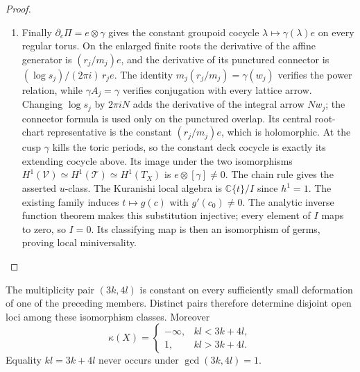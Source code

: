 \begin{proof}
\begin{enumerate}[label=\arabic*.,leftmargin=*]
\item Finally $\partial_c\Pi=e\otimes\gamma$ gives the constant
groupoid cocycle $\lambda\mapsto\gamma(\lambda)e$ on every
regular torus.  On the enlarged finite roots the derivative of the
affine generator is $(r_j/m_j)e$, and the derivative of its
punctured connector is $(\log s_j)/(2\pi i)\,r_je$.
The identity $m_j(r_j/m_j)=\gamma(w_j)$ verifies the power
relation, while $\gamma A_j=\gamma$ verifies conjugation with
every lattice arrow.  Changing $\log s_j$ by $2\pi i N$
adds the derivative of the integral arrow $Nw_j$; the connector
formula is used only on the punctured overlap.  Its central
root-chart representative is the constant $(r_j/m_j)e$,
which is holomorphic.  At the cusp $\gamma$ kills the toric periods,
so the constant deck cocycle is exactly its extending cocycle
above.  Its image under the two isomorphisms
$H^1(\mathcal V)\simeq H^1(\mathcal T)\simeq H^1(T_X)$
is $e\otimes[\gamma]\ne0$.  The chain rule gives the asserted
$u$-class.  The Kuranishi local algebra is
$\mathbb C\{t\}/I$ since $h^1=1$.  The existing family induces
$t\mapsto g(c)$ with $g'(c_0)\ne0$.  The analytic inverse
function theorem makes this substitution injective; every
element of $I$ maps to zero, so $I=0$.  Its classifying map is
then an isomorphism of germs, proving local miniversality.
\end{enumerate}
\end{proof}

\begin{proposition}\label{push:src:E.2.2}

The multiplicity pair $(3k,4l)$ is constant on every sufficiently
small deformation of one of the preceding members.  Distinct
pairs therefore determine disjoint open loci among these
isomorphism classes.  Moreover
\[
 \kappa(X)=\begin{cases}-\infty,&kl<3k+4l,\\1,&kl>3k+4l.
 \end{cases}
\]
Equality $kl=3k+4l$ never occurs under $\gcd(3k,4l)=1$.
\end{proposition}


